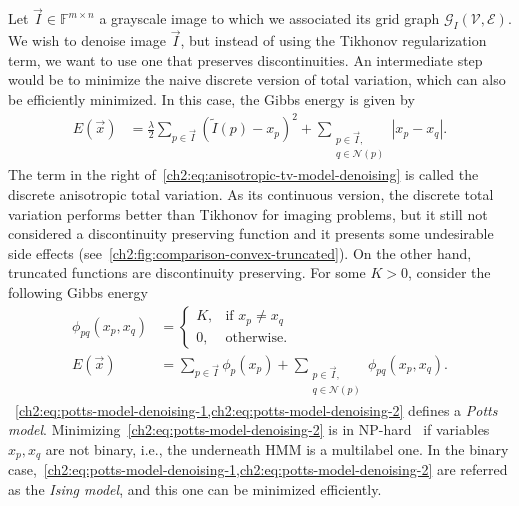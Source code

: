 Let $\vec{I} \in \mathbb{F}^{m \times n}$ a grayscale image to which we associated its grid graph $\mathcal{G}_I(\mathcal{V},\mathcal{E})$. We wish to denoise image $\vec{I}$, but instead of using the Tikhonov regularization term, we want to use one that preserves discontinuities. An intermediate step would be to minimize the naive discrete version of total variation, which can also be efficiently minimized. In this case, the Gibbs energy is given by
\begin{align}
	E(\vec{x}) &= \frac{\lambda}{2}\sum_{p \in \vec{I} }{ (\widetilde{I}(p) - x_p)^2} + \sum_{ \substack{ p \in \vec{I}, \\ q \in \mathcal{N}(p) }}{ | x_p - x_q | }.	
	\label{ch2:eq:anisotropic-tv-model-denoising}
\end{align}
%
The term in the right of~\cref{ch2:eq:anisotropic-tv-model-denoising} is called the discrete anisotropic total variation. As its continuous version, the discrete total variation performs better than Tikhonov for imaging problems, but it still not considered a discontinuity preserving function and it presents some undesirable side effects (see~\cref{ch2:fig:comparison-convex-truncated}). On the other hand, truncated functions are discontinuity preserving. For some $K>0$, consider the following Gibbs energy
\begin{align}
	\phi_{pq}(x_p,x_q) &= \left\{ \begin{array}{rl}
		K,& \text{if } x_p \neq x_q \\
		0,& \text{otherwise}.
	\end{array}\right. \label{ch2:eq:potts-model-denoising-1} \\[1em]
	E(\vec{x}) &= \sum_{p \in \vec{I} }{\phi_p(x_p)} + \sum_{\substack{ p \in \vec{I}, \\ q \in \mathcal{N}(p) }}{\phi_{pq}(x_p,x_q)}.	
	\label{ch2:eq:potts-model-denoising-2}
\end{align}
%
~\cref{ch2:eq:potts-model-denoising-1,ch2:eq:potts-model-denoising-2} defines a \emph{Potts model}. Minimizing~\cref{ch2:eq:potts-model-denoising-2} is in NP-hard~\cite{boykov01fast} if variables $x_p,x_q$ are not binary, i.e., the underneath HMM is a multilabel one. In the binary case,~\cref{ch2:eq:potts-model-denoising-1,ch2:eq:potts-model-denoising-2} are referred as the \emph{Ising model}, and this one can be minimized efficiently.

